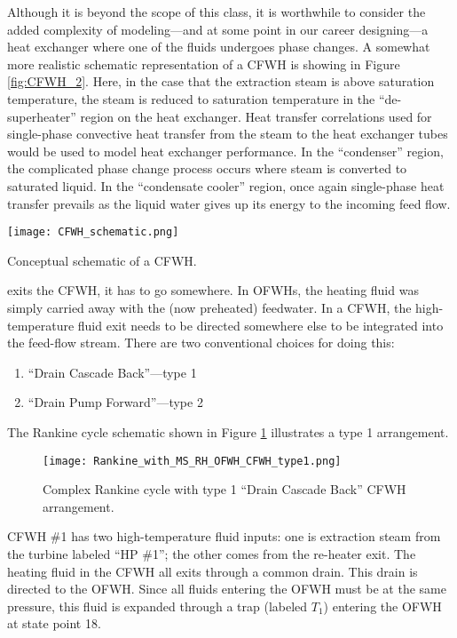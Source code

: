 Although it is beyond the scope of this class, it is worthwhile to consider the added complexity of modeling---and at some point in our career designing---a heat exchanger where one of the fluids undergoes phase changes.  A somewhat more realistic schematic representation of a CFWH is showing in Figure \ref{fig:CFWH_2}.  Here, in the case that the extraction steam is above saturation temperature, the steam is reduced to saturation temperature in the ``de-superheater'' region on the heat exchanger.  Heat transfer correlations used for single-phase convective heat transfer from the steam to the heat exchanger tubes would be used to model heat exchanger performance.  In the ``condenser'' region, the complicated phase change process occurs where steam is converted to saturated liquid.  In the ``condensate cooler'' region, once again single-phase heat transfer prevails as the liquid water gives up its energy to the incoming feed flow.

\begin{marginfigure}
\texttt{[image: CFWH\_schematic.png]}
\caption{Conceptual schematic of a CFWH.}
\label{fig:CFWH_2}
\end{marginfigure}


 exits the CFWH, it has to go somewhere.  In OFWHs, the heating fluid was simply carried away with the (now preheated) feedwater.  In a CFWH, the high-temperature fluid exit needs to be directed somewhere else to be integrated into the feed-flow stream.  There are two conventional choices for doing this:
\begin{enumerate}
\item ``Drain Cascade Back''---type 1
\item ``Drain Pump Forward''---type 2
\end{enumerate}

The Rankine cycle schematic shown in Figure \ref{fig:RC_MS_RH_OFWH_CFWH_t1} illustrates a type 1 arrangement.
\begin{figure}
\texttt{[image: Rankine\_with\_MS\_RH\_OFWH\_CFWH\_type1.png]}
\caption{Complex Rankine cycle with type 1 ``Drain Cascade Back'' CFWH arrangement.}
\label{fig:RC_MS_RH_OFWH_CFWH_t1}
\end{figure}
CFWH \#1 has two high-temperature fluid inputs: one is extraction steam from the turbine labeled ``HP \#1''; the other comes from the re-heater exit.  The heating fluid in the CFWH all exits through a common drain.  This drain is directed to the OFWH.  Since all fluids entering the OFWH must be at the same pressure, this fluid is expanded through a trap (labeled $T_1$) entering the OFWH at state point 18.

